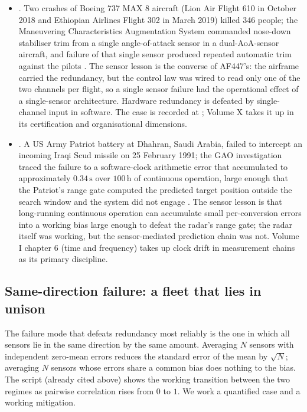 \begin{itemize}[leftmargin=*]
  \item {}. Two crashes of
    Boeing 737 MAX 8 aircraft (Lion Air Flight 610 in October 2018
    and Ethiopian Airlines Flight 302 in March 2019) killed 346
    people; the Maneuvering Characteristics Augmentation System
    commanded nose-down stabiliser trim from a single
    angle-of-attack sensor in a dual-AoA-sensor aircraft, and
    failure of that single sensor produced repeated automatic
    trim against the pilots \cite{acc:house-737max-2020}. The
    sensor lesson is the converse of AF447's: the airframe
    carried the redundancy, but the control law was wired to read
    only one of the two channels per flight, so a single sensor
    failure had the operational effect of a single-sensor
    architecture. Hardware redundancy is defeated by
    single-channel input in software. The case is recorded at
    ;
    Volume X takes it up in its certification and organisational
    dimensions.
  \item {}. A US
    Army Patriot battery at Dhahran, Saudi Arabia, failed to
    intercept an incoming Iraqi Scud missile on 25 February 1991;
    the GAO investigation traced the failure to a software-clock
    arithmetic error that accumulated to approximately
    $0.34 \,\si{\second}$ over $100 \,\si{\hour}$ of continuous
    operation, large enough that the Patriot's range gate
    computed the predicted target position outside the search
    window and the system did not engage
    \cite{acc:gao-patriot-1992}. The sensor lesson is that
    long-running continuous operation can accumulate small
    per-conversion errors into a working bias large enough to
    defeat the radar's range gate; the radar itself was working,
    but the sensor-mediated prediction chain was not. Volume I
    chapter 6 (time and frequency) takes up clock drift in
    measurement chains as its primary discipline.
\end{itemize}

\subsection{Same-direction failure: a fleet that lies in unison}

The failure mode that defeats redundancy most reliably is the one
in which all sensors lie in the same direction by the same amount.
Averaging $N$ sensors with independent zero-mean errors reduces the
standard error of the mean by $\sqrt{N}$; averaging $N$ sensors
whose errors share a common bias does nothing to the bias. The
script  (already cited
above) shows the working transition between the two regimes as
pairwise correlation rises from $0$ to $1$. We work a quantified
case and a working mitigation.


